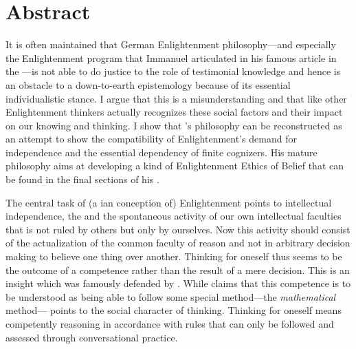 \section*{Abstract}\markboth{}{}
It is often maintained that German Enlightenment philosophy---and especially the
Enlightenment program that Immanuel  articulated in his
famous article in the ---is not able to do
justice to the role of testimonial knowledge and hence is an obstacle to a down-to-earth
epistemology because of its essential individualistic stance. I
argue that this is a misunderstanding and that  like other
Enlightenment thinkers actually recognizes these social factors and their impact on our
knowing and thinking. I show that 's philosophy can be
reconstructed as an attempt to show the compatibility of Enlightenment's demand
for independence and the essential dependency of finite cognizers. His mature philosophy aims at
developing a kind of Enlightenment Ethics of Belief that can be found in the
final sections of his .

The central task of (a ian conception of) Enlightenment
points to intellectual independence, the  and
the spontaneous activity of our own intellectual faculties that is not ruled by
others but only by ourselves. Now this activity should consist of the
actualization of the common faculty of reason and not in arbitrary
decision making to believe one thing over another. Thinking for oneself
thus seems to be the outcome of a competence rather than the result of a mere
decision. This is an insight which was famously defended by
. While
 claims that
this competence is to be understood as being able to follow some special
method---the \emph{mathematical} method--- points to the social
character of thinking. Thinking for oneself means competently reasoning in
accordance with rules that can only be followed and assessed through
conversational practice.

